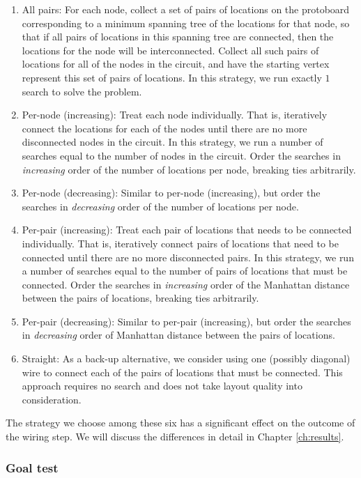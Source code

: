 \begin{enumerate}
\item All pairs: For each node, collect a set of pairs of locations on the
protoboard
corresponding to a minimum spanning tree of the locations for that node, so that
if all pairs of locations in this spanning tree are connected, then the
locations for the node will be interconnected. Collect all such pairs of
locations for all of the nodes in the circuit, and have the starting vertex
represent
this set of pairs of locations. In this strategy, we run exactly $1$ search to
solve the problem.
\item Per-node (increasing): Treat each node individually. That is, iteratively
connect the locations for each of the nodes until there are no more disconnected
nodes in the circuit. In this strategy, we run a number of searches equal to the
number of nodes in the circuit. Order the searches in
\emph{increasing} order of the number of locations per node, breaking ties
arbitrarily.
\item Per-node (decreasing): Similar to per-node (increasing), but order the
searches in \emph{decreasing} order of the number of locations per node.
\item Per-pair (increasing): Treat each pair of locations that needs to be
connected individually. That is, iteratively connect pairs of locations that need
to be connected until there are no more disconnected pairs.
In this strategy, we run a number of searches equal to the number of pairs of
locations that must be connected. Order the searches in \emph{increasing} order
of the Manhattan distance between the pairs of locations, breaking ties
arbitrarily.
\item Per-pair (decreasing): Similar to per-pair (increasing), but order the
searches in \emph{decreasing} order of Manhattan distance between the pairs of
locations.
\item Straight: As a back-up alternative, we consider using one (possibly
diagonal) wire to connect
each of the pairs of locations that must be connected. This approach requires no
search and does not take layout quality into consideration.
\end{enumerate}

The strategy we choose among these six
has a significant effect on the outcome of the wiring step.
We will discuss the differences in detail in Chapter \ref{ch:results}.

\subsubsection{Goal test}

